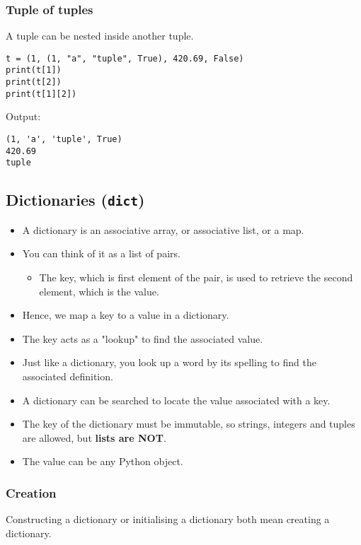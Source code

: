 \documentclass[11pt]{article}
\begin{document}
\subsubsection{Tuple of tuples}
\label{sec:orga2775af}
A tuple can be nested inside another tuple.
\begin{verbatim}
t = (1, (1, "a", "tuple", True), 420.69, False)
print(t[1])
print(t[2])
print(t[1][2])
\end{verbatim}

 \noindent Output:

\begin{verbatim}
(1, 'a', 'tuple', True)
420.69
tuple
\end{verbatim}


 \newpage

\subsection{Dictionaries (\texttt{dict})}
\label{sec:orgc12a682}
\begin{itemize}
\item A dictionary is an associative array, or associative list, or a map.
\item You can think of it as a list of pairs.
\begin{itemize}
\item The key, which is first element of the pair, is used to retrieve the second element, which is the value.
\end{itemize}
\item Hence, we map a key to a value in a dictionary.
\item The key acts as a "lookup" to find the associated value.
\item Just like a dictionary, you look up a word by its spelling to find the associated definition.
\item A dictionary can be searched to locate the value associated with a key.
\item The key of the dictionary must be immutable, so strings, integers and tuples are allowed, but \textbf{lists are NOT}.
\item The value can be any Python object.
\end{itemize}

\subsubsection{Creation}
\label{sec:org618e13c}
Constructing a dictionary or initialising a dictionary both mean creating a dictionary.
\end{document}
